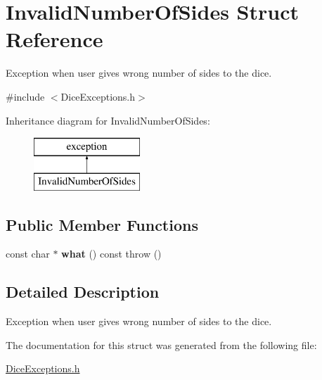\hypertarget{struct_invalid_number_of_sides}{}\section{Invalid\+Number\+Of\+Sides Struct Reference}
\label{struct_invalid_number_of_sides}


Exception when user gives wrong number of sides to the dice.  




{\ttfamily \#include $<$Dice\+Exceptions.\+h$>$}

Inheritance diagram for Invalid\+Number\+Of\+Sides\+:\begin{figure}[H]
\begin{center}
\leavevmode
\includegraphics[height=2.000000cm]{struct_invalid_number_of_sides}
\end{center}
\end{figure}
\subsection*{Public Member Functions}
\begin{DoxyCompactItemize}
\item 
\hypertarget{struct_invalid_number_of_sides_aaf59fa22c4dab2b5cee65df1e3250d1a}{}\label{struct_invalid_number_of_sides_aaf59fa22c4dab2b5cee65df1e3250d1a} 
const char $\ast$ {\bfseries what} () const  throw ()
\end{DoxyCompactItemize}


\subsection{Detailed Description}
Exception when user gives wrong number of sides to the dice. 

The documentation for this struct was generated from the following file\+:\begin{DoxyCompactItemize}
\item 
\hyperlink{_dice_exceptions_8h}{Dice\+Exceptions.\+h}\end{DoxyCompactItemize}
